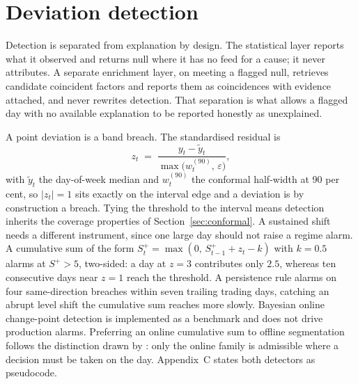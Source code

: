 \section{Deviation detection}
\label{sec:detection}

Detection is separated from explanation by design. The statistical layer reports what it observed
and returns null where it has no feed for a cause; it never attributes. A separate enrichment
layer, on meeting a flagged null, retrieves candidate coincident factors and reports them as
coincidences with evidence attached, and never rewrites detection. That separation is what allows
a flagged day with no available explanation to be reported honestly as unexplained.

A point deviation is a band breach. The standardised residual is
\begin{equation}
z_t \;=\; \frac{y_t - \tilde{y}_t}{\max\bigl(w_t^{(90)},\, \varepsilon\bigr)},
\label{eq:z}
\end{equation}
with $\tilde{y}_t$ the day-of-week median and $w_t^{(90)}$ the conformal half-width at 90 per
cent, so $\lvert z_t \rvert = 1$ sits exactly on the interval edge and a deviation is by
construction a breach. Tying the threshold to the interval means detection inherits the coverage
properties of Section~\ref{sec:conformal}. A sustained shift needs a different instrument, since
one large day should not raise a regime alarm. A cumulative sum \citep{page_continuous_1954} of
the form $S^{+}_t = \max(0,\, S^{+}_{t-1} + z_t - k)$ with $k = 0.5$ alarms at $S^{+} > 5$,
two-sided: a day at $z = 3$ contributes only $2.5$, whereas ten consecutive days near $z = 1$
reach the threshold. A persistence rule alarms on four same-direction breaches within seven
trailing trading days, catching an abrupt level shift the cumulative sum reaches more slowly.
Bayesian online change-point detection \citep{adams_bayesian_2007} is implemented as a benchmark
and does not drive production alarms. Preferring an online cumulative sum to offline segmentation
follows the distinction drawn by \citet{truong_selective_2020}: only the online family is
admissible where a decision must be taken on the day. Appendix~C states both detectors as
pseudocode.

